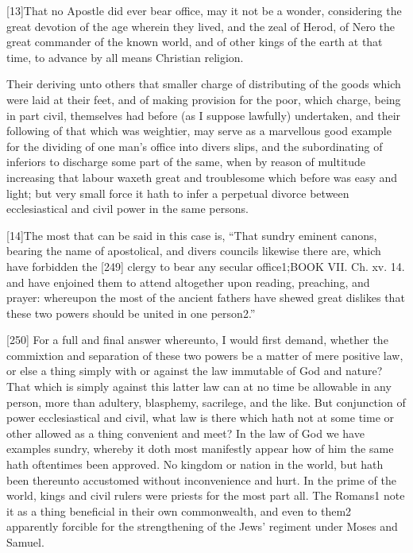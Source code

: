 [13]That no Apostle did ever bear office, may it not be a wonder, considering the great devotion of the age wherein they lived, and the zeal of Herod, of Nero the great commander of the known world, and of other kings of the earth at that time, to advance by all means Christian religion.

Their deriving unto others that smaller charge of distributing of the goods which were laid at their feet, and of making provision for the poor, which charge, being in part civil, themselves had before (as I suppose lawfully) undertaken, and their following of that which was weightier, may serve as a marvellous good example for the dividing of one man’s office into divers slips, and the subordinating of inferiors to discharge some part of the same, when by reason of multitude increasing that labour waxeth great and troublesome which before was easy and light; but very small force it hath to infer a perpetual divorce between ecclesiastical and civil power in the same persons.

[14]The most that can be said in this case is, “That sundry eminent canons, bearing the name of apostolical, and divers councils likewise there are, which have forbidden the [249] clergy to bear any secular office1;BOOK VII. Ch. xv. 14. and have enjoined them to attend altogether upon reading, preaching, and prayer: whereupon the most of the ancient fathers have shewed great dislikes that these two powers should be united in one person2.”

[250]
For a full and final answer whereunto, I would first demand, whether the commixtion and separation of these two powers be a matter of mere positive law, or else a thing simply with or against the law immutable of God and nature? That which is simply against this latter law can at no time be allowable in any person, more than adultery, blasphemy, sacrilege, and the like. But conjunction of power ecclesiastical and civil, what law is there which hath not at some time or other allowed as a thing convenient and meet? In the law of God we have examples sundry, whereby it doth most manifestly appear how of him the same hath oftentimes been approved. No kingdom or nation in the world, but hath been thereunto accustomed without inconvenience and hurt. In the prime of the world, kings and civil rulers were priests for the most part all. The Romans1 note it as a thing beneficial in their own commonwealth, and even to them2 apparently forcible for the strengthening of the Jews’ regiment under Moses and Samuel.

